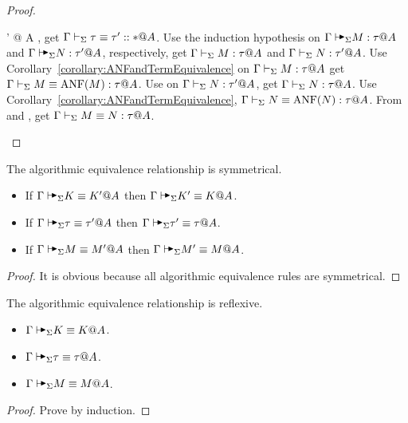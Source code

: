 \begin{proof}
\begin{rneqncase}{\QAANF}
        \AVS \tau \E \tau' @ A \), get \( \Gamma \vdash_\Sigma \tau \equiv \tau' :: * @ A \). Use
        the induction hypothesis on \( \G \AVS M : \tau @ A \) and \( \G \AVS N
        : \tau' @ A \), respectively, get \( \Gamma \vdash_\Sigma M : \tau @ A \) and \( \Gamma \vdash_\Sigma
        N : \tau' @ A \). Use Corollary~\ref{corollary:ANFandTermEquivalence}
        on \( \Gamma \vdash_\Sigma M : \tau @ A \)  get \( \Gamma \vdash_\Sigma M \equiv \text{ANF}(M) : \tau @ A \).
        Use \TConv on \( \Gamma \vdash_\Sigma N : \tau' @ A \), get \( \Gamma \vdash_\Sigma N : \tau @ A \).
        Use Corollary~\ref{corollary:ANFandTermEquivalence}, \( \Gamma \vdash_\Sigma N \equiv
        \text{ANF}(N) : \tau @ A \). From \QTrans and \QSym, get \( \Gamma \vdash_\Sigma M \equiv N :
        \tau @ A \).
    \end{rneqncase}
\end{proof}

\begin{lemma}
    The algorithmic equivalence relationship is symmetrical.
    \label{lemma:SymmetricityinAlgorithmicEquivalence}
    \begin{itemize}
        \item If \( \G \AVS K \E K' @ A \) then \( \G \AVS K' \E K @ A \).
        \item If \( \G \AVS \tau \E \tau' @ A \) then \( \G \AVS \tau' \E \tau @ A \).
        \item If \( \G \AVS M \E M' @ A \) then \( \G \AVS M' \E M @ A \).
    \end{itemize}
\end{lemma}

\begin{proof}
    It is obvious because all algorithmic equivalence rules are symmetrical.
\end{proof}

\begin{lemma}
    The algorithmic equivalence relationship is reflexive.
    \label{lemma:ReflexivityinAlgorithmicEquivalence}
    \begin{itemize}
        \item \( \G \AVS K \E K @ A \).
        \item \( \G \AVS \tau \E \tau @ A \).
        \item \( \G \AVS M \E M @ A \).
    \end{itemize}
\end{lemma}

\begin{proof}
    Prove by induction.
\end{proof}

